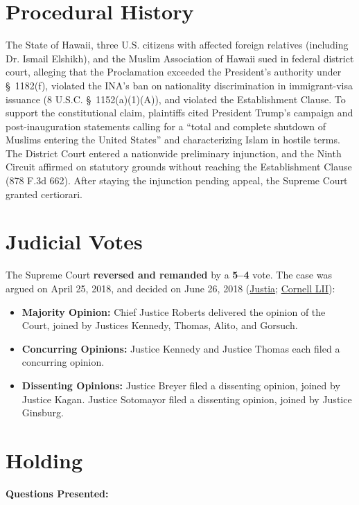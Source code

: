 \documentclass[12pt]{article}
\begin{document}
\section{Procedural History}
The State of Hawaii, three U.S. citizens with affected foreign relatives (including Dr. Ismail Elshikh), and the Muslim Association of Hawaii sued in federal district court, alleging that the Proclamation exceeded the President's authority under \S~1182(f), violated the INA's ban on nationality discrimination in immigrant-visa issuance (8 U.S.C. \S~1152(a)(1)(A)), and violated the Establishment Clause. To support the constitutional claim, plaintiffs cited President Trump's campaign and post-inauguration statements calling for a ``total and complete shutdown of Muslims entering the United States'' and characterizing Islam in hostile terms. The District Court entered a nationwide preliminary injunction, and the Ninth Circuit affirmed on statutory grounds without reaching the Establishment Clause (878 F.3d 662). After staying the injunction pending appeal, the Supreme Court granted certiorari.

\section{Judicial Votes}
The Supreme Court \textbf{reversed and remanded} by a \textbf{5--4} vote. The case was argued on April 25, 2018, and decided on June 26, 2018 (\href{https://supreme.justia.com/cases/federal/us/585/17-965/}{Justia}; \href{https://www.law.cornell.edu/supremecourt/text/17-965}{Cornell LII}):

\begin{itemize}
    \item \textbf{Majority Opinion:} Chief Justice Roberts delivered the opinion of the Court, joined by Justices Kennedy, Thomas, Alito, and Gorsuch.
    \item \textbf{Concurring Opinions:} Justice Kennedy and Justice Thomas each filed a concurring opinion.
    \item \textbf{Dissenting Opinions:} Justice Breyer filed a dissenting opinion, joined by Justice Kagan. Justice Sotomayor filed a dissenting opinion, joined by Justice Ginsburg.
\end{itemize}

\section{Holding}
\textbf{Questions Presented:}
\end{document}
